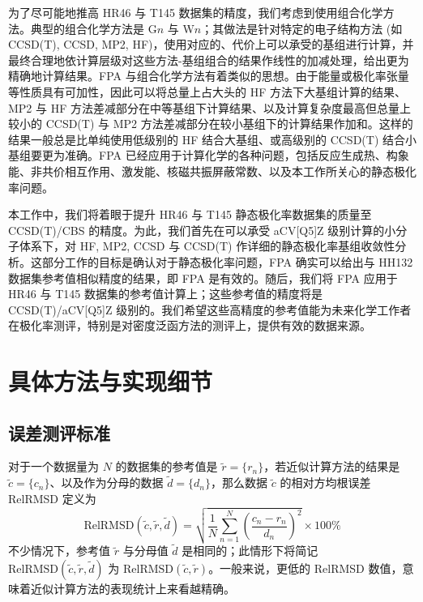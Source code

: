 为了尽可能地推高 HR46 与 T145 数据集的精度，我们考虑到使用组合化学方法。典型的组合化学方法是 G$n$\cite{Pople-Curtiss.JCP.1989, Curtiss-Pople.JCP.1990, Curtiss-Pople.JCP.1991, Curtiss-Pople.JCP.1998, Curtiss-Raghavachari.JCP.2007} 与 W$n$\cite{Martin-Oliveira.JCP.1999, Parthiban-Martin.JCP.2001}；其做法是针对特定的电子结构方法 (如 CCSD(T), CCSD, MP2, HF)，使用对应的、代价上可以承受的基组进行计算，并最终合理地依计算层级对这些方法-基组组合的结果作线性的加减处理，给出更为精确地计算结果。FPA 与组合化学方法有着类似的思想\cite{East-Allen.JCP.1993}。由于能量或极化率张量等性质具有可加性，因此可以将总量上占大头的 HF 方法下大基组计算的结果、MP2 与 HF 方法差减部分在中等基组下计算结果、以及计算复杂度最高但总量上较小的 CCSD(T) 与 MP2 方法差减部分在较小基组下的计算结果作加和。这样的结果一般总是比单纯使用低级别的 HF 结合大基组、或高级别的 CCSD(T) 结合小基组要更为准确。FPA 已经应用于计算化学的各种问题，包括反应生成热\cite{East-Allen.JCP.1993, Nielsen-Schaefer.JCP.1997}、构象能\cite{Csaszar-Schaefer.JCP.1998, Tschumper-Tschumper.JCP.2001, Kahn-Kahn.JCC.2008}、非共价相互作用\cite{Tschumper-Quack.JCP.2002, Jurecka-Hobza.PCCP.2006, Marshall-Sherrill.JCP.2011}、激发能\cite{Bokareva-Godunov.IJQC.2008}、核磁共振屏蔽常数\cite{Sun-Xu.JCP.2013, Wang-Xu.JCP.2018}、以及本工作所关心的静态极化率问题\cite{Huzak-Deleuze.JCP.2013, Monten-Deleuze.MP.2011}。

本工作中，我们将着眼于提升 HR46 与 T145 静态极化率数据集的质量至 CCSD(T)/CBS 的精度。为此，我们首先在可以承受 aCV[Q5]Z 级别计算的小分子体系下，对 HF, MP2, CCSD 与 CCSD(T) 作详细的静态极化率基组收敛性分析。这部分工作的目标是确认对于静态极化率问题，FPA 确实可以给出与 HH132 数据集参考值相似精度的结果，即 FPA 是有效的。随后，我们将 FPA 应用于 HR46 与 T145 数据集的参考值计算上；这些参考值的精度将是 CCSD(T)/aCV[Q5]Z 级别的。我们希望这些高精度的参考值能为未来化学工作者在极化率测评，特别是对密度泛函方法的测评上，提供有效的数据来源。

\section{具体方法与实现细节}
\label{sec.5.detail}

\subsection{误差测评标准}

对于一个数据量为 $N$ 的数据集的参考值是 $\tilde r = \{ r_n \}$，若近似计算方法的结果是 $\tilde c = \{ c_n \}$、以及作为分母的数据 $\tilde d = \{ d_n \}$，那么数据 $\tilde c$ 的相对方均根误差 RelRMSD 定义为
\begin{equation}
    \label{eq.5.relrmsd}
    \text{RelRMSD} (\tilde c, \tilde r, \tilde d) = \sqrt{\frac{1}{N} \sum_{n = 1}^N \left( \frac{c_n - r_n}{d_n} \right)^2} \times 100\%
\end{equation}
不少情况下，参考值 $\tilde r$ 与分母值 $\tilde d$ 是相同的；此情形下将简记 $\text{RelRMSD} (\tilde c, \tilde r, \tilde d)$ 为 $\text{RelRMSD} (\tilde c, \tilde r)$。一般来说，更低的 RelRMSD 数值，意味着近似计算方法的表现统计上来看越精确。

